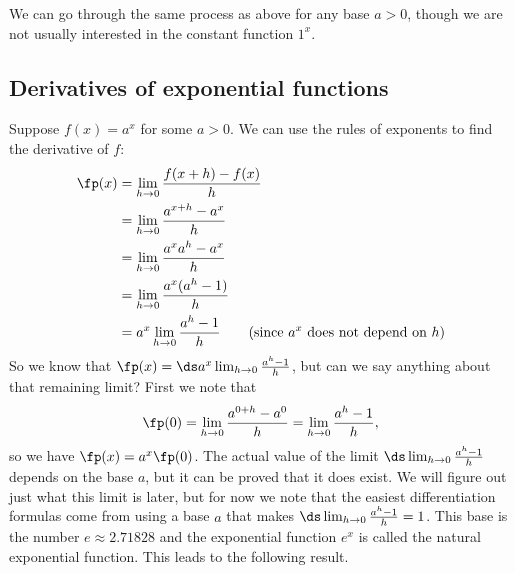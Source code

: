 We can go through the same process as above for any base $a>0$, though we are not usually interested in the constant function $1^x$.


\subsection{Derivatives of exponential functions}

Suppose $f(x)=a^x$ for some $a>0$. We can use the rules of exponents to find the derivative of $f$:
\begin{align*}
	\fp(x)
	&=\lim_{h\to 0}\frac{f(x+h)-f(x)}{h}\\
	&=\lim_{h\to 0}\frac{a^{x+h}-a^x}{h}\\
	&=\lim_{h\to 0}\frac{a^xa^h-a^x}{h}\\
	&=\lim_{h\to 0}\frac{a^x(a^h-1)}{h}\\
	&=a^x\lim_{h\to 0}\frac{a^h-1}{h} \qquad\text{(since $a^x$ does not depend on $h$)}\\
\end{align*}
So we know that $\fp(x)=\ds a^x \lim_{h\to 0}\frac{a^h-1}{h}$, but can we say anything about that remaining limit? First we note that
\[\fp(0)=\lim_{h\to 0}\frac  {a^{0+h}-a^0}{h}=\lim_{h\to 0}\frac{a^h-1}{h},\]
so we have $\fp(x)=a^x\fp(0)$. The actual value of the limit $\ds\lim_{h\to 0}\frac{a^h-1}{h}$ depends on the base $a$, but it can be proved that it does exist. We will figure out just what this limit is later, but for now we note that the easiest differentiation formulas come from using a base $a$ that makes $\ds\lim_{h\to 0}\frac{a^h-1}{h}=1$. This base is the
number $e\approx 2.71828$ and the exponential function $e^x$ is called the natural exponential function. This leads to the following result.

